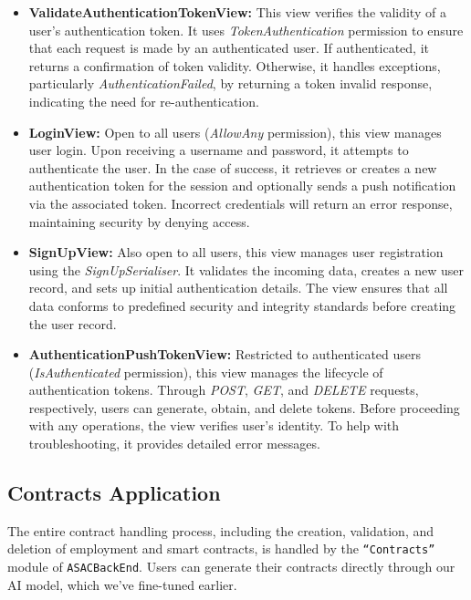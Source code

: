 \begin{itemize}
    \item \textbf{ValidateAuthenticationTokenView:} This view verifies the validity of a user's authentication token. It uses \textit{TokenAuthentication} permission to ensure that each request is made by an authenticated user. If authenticated, it returns a confirmation of token validity. Otherwise, it handles exceptions, particularly \textit{AuthenticationFailed}, by returning a token invalid response, indicating the need for re-authentication.

    \item \textbf{LoginView:}
     Open to all users (\textit{AllowAny} permission), this view manages user login. Upon receiving a username and password, it attempts to authenticate the user. In the case of success, it retrieves or creates a new authentication token for the session and optionally sends a push notification via the associated token. Incorrect credentials will return an error response, maintaining security by denying access.

    \item \textbf{SignUpView:} Also open to all users, this view manages user registration using the \textit{SignUpSerialiser}. It validates the incoming data, creates a new user record, and sets up initial authentication details. The view ensures that all data conforms to predefined security and integrity standards before creating the user record.

    \item \textbf{AuthenticationPushTokenView:} Restricted to authenticated users (\textit{IsAuthenticated} permission), this view manages the lifecycle of authentication tokens. Through \textit{POST}, \textit{GET}, and \textit{DELETE} requests, respectively, users can generate, obtain, and delete tokens. Before proceeding with any operations, the view verifies user's identity. To help with troubleshooting, it provides detailed error messages.
\end{itemize}

\subsection{Contracts Application}

The entire contract handling process, including the creation, validation, and deletion of employment and smart contracts, is handled by the \texttt{``Contracts''} module of \texttt{ASACBackEnd}. Users can generate their contracts directly through our AI model, which we've fine-tuned earlier.

